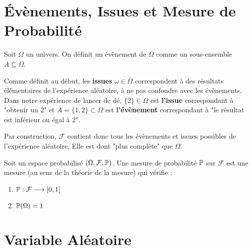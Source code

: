 
\section{Évènements, Issues et Mesure de Probabilité }

\begin{definition}[Évènement]
    Soit $\Omega$ un univers. On définit un évènement de $\Omega$ comme un sous-ensemble $A \subseteq \Omega$. 
\end{definition}

\begin{remark}
    Comme définit au début, les \textbf{issues} $ \omega \in \Omega$ correspondent à des résultats élémentaires de l'expérience 
    aléatoire, à ne pas confondre avec les évènements. 
    Dans notre expérience de lancer de dé, $\{2\} \in \Omega$ est \textbf{l'issue} correspondant à "obtenir un 2" et 
    $A = \{1,2\} \subset \Omega$ est \textbf{l'évènement} correspondant à "le résultat est inférieur ou égal à 2". 
\end{remark}

Par construction, $ \mathcal{F}$ contient donc tous les évènements et issues possibles de l'expérience aléatoire. 
Elle est dont "plus complète" que $\Omega$. 

\begin{definition}
    Soit un espace probabilisé $(\Omega, \mathcal{F}, \mathbb{P})$. Une mesure de probabilité $ \mathbb{P}$ 
    sur $ \mathcal{F}$ est une mesure (au sens de la théorie de la mesure) qui vérifie : 
    \begin{enumerate}
        \item $ \mathbb{P} : \mathcal{F} \longrightarrow [0,1]$
        \item $ \mathbb{P}(\Omega) = 1$ 
    \end{enumerate}
\end{definition}


\section{Variable Aléatoire}

